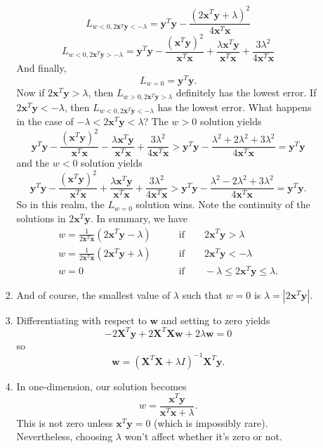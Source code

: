 \documentclass[12pt]{article}
\newcommand{\x}{\mathbf x}
\newcommand{\w}{\mathbf w}
\newcommand{\y}{\mathbf y}
\newcommand{\X}{\mathbf X}
\begin{document}
\begin{enumerate}[leftmargin=*]
\begin{enumerate}[label = \Alph*.]
\begin{enumerate}
\[ L_{w < 0, 2 \x^T \y < -\lambda} = \y^T \y - \frac{(2 \x^T \y + \lambda)^2}{4 \x^T \x} \]
\[ L_{w < 0, 2 \x^T \y > -\lambda} = \y^T \y - \frac{(\x^T \y)^2}{\x^T \x} + \frac{\lambda \x^T \y}{\x^T \x} + \frac{3 \lambda^2}{4 \x^T \x} \]
And finally,
\[ L_{w = 0} = \y^T \y. \]
Now if $2 \x^T \y > \lambda$, then $L_{w>0, 2\x^T \y > \lambda}$ definitely has the lowest error. If $2 \x^T \y < - \lambda$, then $L_{w < 0, 2 \x^T \y < - \lambda}$ has the lowest error. What happens in the case of $- \lambda < 2 \x^T \y < \lambda$? The $w > 0$ solution yields
\[ \y^T \y - \frac{(\x^T \y)^2}{\x^T \x} - \frac{\lambda \x^T \y}{\x^T \x} + \frac{3\lambda^2}{4 \x^T \x} > \y^T \y - \frac{\lambda^2 + 2 \lambda^2 + 3 \lambda^2}{4 \x^T \x} = \y^T \y \]
and the $w < 0$ solution yields
\[ \y^T \y - \frac{(\x^T \y)^2}{\x^T \x} + \frac{\lambda \x^T \y}{\x^T \x} + \frac{3 \lambda^2}{4 \x^T \x} > \y^T \y - \frac{\lambda^2 - 2 \lambda^2 + 3 \lambda^2}{4 \x^T \x} = \y^T \y. \]
So in this realm, the $L_{w = 0}$ solution wins. Note the continuity of the solutions in $2 \x^T \y$. In summary, we have
\begin{align*}
w = \frac{1}{2 \x^T \x} (2 \x^T \y - \lambda) \qquad &\text{if} \qquad 2 \x^T \y > \lambda \\
w = \frac{1}{2 \x^T \x} (2 \x^T \y + \lambda) \qquad &\text{if} \qquad 2 \x^T \y < - \lambda \\
w = 0 \qquad &\text{if} \qquad - \lambda \leq 2 \x^T \y  \leq \lambda.
\end{align*}
\item And of course, the smallest value of $\lambda$ such that $w = 0$ is $\lambda = |2 \x^T \y|$.
\item Differentiating with respect to $\w$ and setting to zero yields
\[ - 2 \X^T \y + 2 \X^T \X \w + 2 \lambda \w = 0 \]
so
\[ \w = (\X^T \X + \lambda I)^{-1} \X^T \y. \]
\item In one-dimension, our solution becomes
\[ w = \frac{\x^T \y}{\x^T \x + \lambda}. \]
This is not zero unless $\x^T \y = 0$ (which is impossibly rare). Nevertheless, choosing $\lambda$ won't affect whether it's zero or not.
\end{enumerate}
\end{enumerate}
\end{enumerate}
\end{document}
